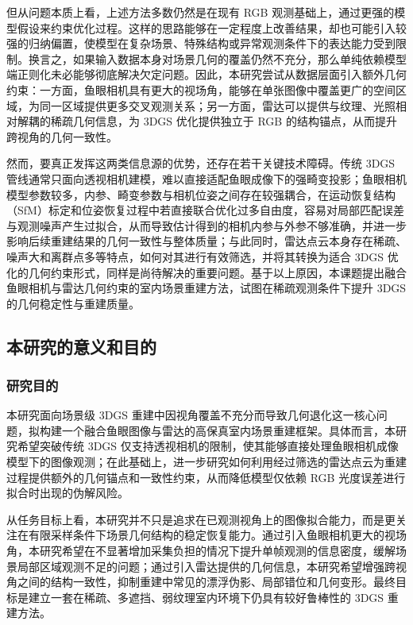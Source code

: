 但从问题本质上看，上述方法多数仍然是在现有 RGB 观测基础上，通过更强的模型假设来约束优化过程。这样的思路能够在一定程度上改善结果，却也可能引入较强的归纳偏置，使模型在复杂场景、特殊结构或异常观测条件下的表达能力受到限制。换言之，如果输入数据本身对场景几何的覆盖仍然不充分，那么单纯依赖模型端正则化未必能够彻底解决欠定问题。因此，本研究尝试从数据层面引入额外几何约束：一方面，鱼眼相机具有更大的视场角，能够在单张图像中覆盖更广的空间区域，为同一区域提供更多交叉观测关系；另一方面，雷达可以提供与纹理、光照相对解耦的稀疏几何信息，为 3DGS 优化提供独立于 RGB 的结构锚点，从而提升跨视角的几何一致性。

然而，要真正发挥这两类信息源的优势，还存在若干关键技术障碍。传统 3DGS 管线通常只面向透视相机建模，难以直接适配鱼眼成像下的强畸变投影；鱼眼相机模型参数较多，内参、畸变参数与相机位姿之间存在较强耦合，在运动恢复结构（SfM）标定和位姿恢复过程中若直接联合优化过多自由度，容易对局部匹配误差与观测噪声产生过拟合，从而导致估计得到的相机内参与外参不够准确，并进一步影响后续重建结果的几何一致性与整体质量；与此同时，雷达点云本身存在稀疏、噪声大和离群点多等特点，如何对其进行有效筛选，并将其转换为适合 3DGS 优化的几何约束形式，同样是尚待解决的重要问题。基于以上原因，本课题提出融合鱼眼相机与雷达几何约束的室内场景重建方法，试图在稀疏观测条件下提升 3DGS 的几何稳定性与重建质量。

\subsection{本研究的意义和目的}

\subsubsection{研究目的}

本研究面向场景级 3DGS 重建中因视角覆盖不充分而导致几何退化这一核心问题，拟构建一个融合鱼眼图像与雷达的高保真室内场景重建框架。具体而言，本研究希望突破传统 3DGS 仅支持透视相机的限制，使其能够直接处理鱼眼相机成像模型下的图像观测；在此基础上，进一步研究如何利用经过筛选的雷达点云为重建过程提供额外的几何锚点和一致性约束，从而降低模型仅依赖 RGB 光度误差进行拟合时出现的伪解风险。

从任务目标上看，本研究并不只是追求在已观测视角上的图像拟合能力，而是更关注在有限采样条件下场景几何结构的稳定恢复能力。通过引入鱼眼相机更大的视场角，本研究希望在不显著增加采集负担的情况下提升单帧观测的信息密度，缓解场景局部区域观测不足的问题；通过引入雷达提供的几何信息，本研究希望增强跨视角之间的结构一致性，抑制重建中常见的漂浮伪影、局部错位和几何变形。最终目标是建立一套在稀疏、多遮挡、弱纹理室内环境下仍具有较好鲁棒性的 3DGS 重建方法。

